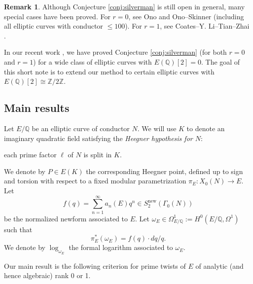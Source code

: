 \documentclass[11pt]{amsart}
\theoremstyle{definition}
\newtheorem{remark}[theorem]{Remark}
\begin{document}
\begin{remark}
  Although Conjecture \ref{conj:silverman} is still open in general, many special cases have been proved. For $r=0$, see Ono \cite{Ono1997} and Ono--Skinner \cite[Cor. 2]{Ono1998} (including all elliptic curves with conductor $\le100$). For $r=1$, see Coates--Y. Li--Tian--Zhai \cite[Thm. 1.1]{Coates2015}.
\end{remark}

In our recent work \cite[Thm. 3.3]{KrizLi2016a}, we have proved Conjecture \ref{conj:silverman} (for both $r=0$ and $r=1$) for a wide class of elliptic curves with $E(\mathbb{Q})[2]=0$. The goal of this short note is to extend our method to certain elliptic curves with $E(\mathbb{Q})[2]\cong \mathbb{Z}/2\mathbb{Z}$.

\subsection{Main results}

Let $E/\mathbb{Q}$ be an elliptic curve of conductor $N$. We will use $K$ to denote an imaginary quadratic field satisfying the \emph{Heegner hypothesis for $N$}:
\begin{center}
each prime factor $\ell$ of $N$ is split in $K$.
\end{center}
We denote by $P\in E(K)$ the corresponding Heegner point, defined up to sign and torsion with respect to a fixed modular parametrization $\pi_E: X_0(N)\rightarrow E$. Let $$f(q)=\sum_{n=1}^\infty a_n(E) q^n\in S_2^\mathrm{new}(\Gamma_0(N))$$ be the normalized newform associated  to $E$. Let $\omega_E\in \Omega_{E/\mathbb{Q}}^1 := H^0(E/\mathbb{Q},\Omega^1)$ such that $$\pi_E^*(\omega_E)= f(q) \cdot dq/q.$$ We denote by $\log_{\omega_E}$ the formal logarithm associated to $\omega_E$.


Our main result is the following criterion for prime twists of $E$ of analytic (and hence algebraic) rank 0 or 1. 
\end{document}
